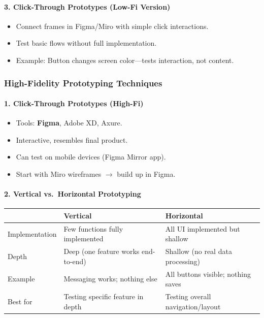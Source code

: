 \paragraph*{3. Click-Through Prototypes (Low-Fi Version)}
\begin{itemize}
  \item Connect frames in Figma/Miro with simple click interactions.
  \item Test basic flows without full implementation.
  \item Example: Button changes screen color---tests interaction, not content.
\end{itemize}

\subsubsection*{High-Fidelity Prototyping Techniques}

\paragraph*{1. Click-Through Prototypes (High-Fi)}
\begin{itemize}
  \item Tools: \textbf{Figma}, Adobe XD, Axure.
  \item Interactive, resembles final product.
  \item Can test on mobile devices (Figma Mirror app).
  \item Start with Miro wireframes $\to$ build up in Figma.
\end{itemize}

\paragraph*{2. Vertical vs.\ Horizontal Prototyping}

\begin{center}
\renewcommand{\arraystretch}{1.3}
\begin{tabular}{@{} l p{5.5cm} p{5.5cm} @{}}
\toprule
& \textbf{Vertical} & \textbf{Horizontal} \\
\midrule
Implementation & Few functions fully implemented & All UI implemented but shallow \\
Depth & Deep (one feature works end-to-end) & Shallow (no real data processing) \\
Example & Messaging works; nothing else & All buttons visible; nothing saves \\
Best for & Testing specific feature in depth & Testing overall navigation/layout \\
\bottomrule
\end{tabular}
\end{center}


